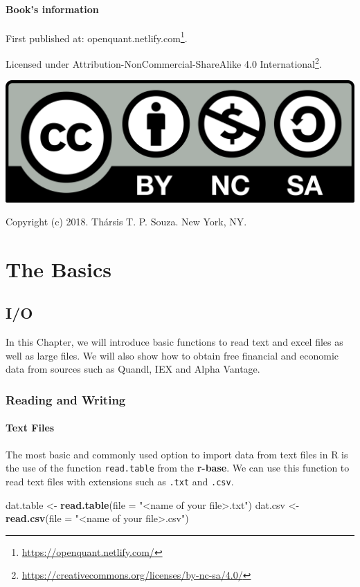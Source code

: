 \documentclass[]{book}
\newenvironment{Shaded}{\begin{snugshade}}{\end{snugshade}}
\newcommand{\KeywordTok}[1]{\textcolor[rgb]{0.13,0.29,0.53}{\textbf{#1}}}
\newcommand{\DataTypeTok}[1]{\textcolor[rgb]{0.13,0.29,0.53}{#1}}
\newcommand{\StringTok}[1]{\textcolor[rgb]{0.31,0.60,0.02}{#1}}
\newcommand{\NormalTok}[1]{#1}
\DeclareRobustCommand{\href}[2]{#2\footnote{\url{#1}}}
\theoremstyle{definition}
\theoremstyle{definition}
\theoremstyle{definition}
\theoremstyle{remark}
\let\BeginKnitrBlock\begin \let\EndKnitrBlock\end
\begin{document}
\subsection*{Book's information}\label{books-information}


First published at:
\href{https://openquant.netlify.com/}{openquant.netlify.com}.

Licensed under
\href{https://creativecommons.org/licenses/by-nc-sa/4.0/}{Attribution-NonCommercial-ShareAlike
4.0 International}.

\includegraphics[width=0.15\linewidth]{fig/by-nc-sa}

\BeginKnitrBlock{flushright}
Copyright (c) 2018. Thársis T. P. Souza. New York, NY.
\EndKnitrBlock{flushright}

\part{The Basics}\label{part-the-basics}

\chapter{I/O}\label{io}

In this Chapter, we will introduce basic functions to read text and
excel files as well as large files. We will also show how to obtain free
financial and economic data from sources such as Quandl, IEX and Alpha
Vantage.

\section{Reading and Writing}\label{reading-and-writing}

\subsection{Text Files}\label{text-files}

The most basic and commonly used option to import data from text files
in R is the use of the function \texttt{read.table} from the
\textbf{r-base}. We can use this function to read text files with
extensions such as \texttt{.txt} and \texttt{.csv}.

\begin{Shaded}
\begin{Highlighting}[]
\NormalTok{dat.table <-}\StringTok{ }\KeywordTok{read.table}\NormalTok{(}\DataTypeTok{file =} \StringTok{"<name of your file>.txt"}\NormalTok{)}
\NormalTok{dat.csv <-}\StringTok{ }\KeywordTok{read.csv}\NormalTok{(}\DataTypeTok{file =} \StringTok{"<name of your file>.csv"}\NormalTok{)}
\end{Highlighting}
\end{Shaded}
\end{document}
